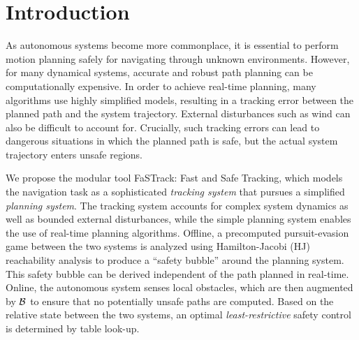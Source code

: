 \section{Introduction}
 As autonomous systems become more commonplace, it is essential to perform motion planning safely for navigating through unknown environments. However, for many dynamical systems, accurate and robust path planning can be computationally expensive. In order to achieve real-time planning, many algorithms use highly simplified models, resulting in a tracking error between the planned path and the system trajectory. External disturbances such as wind can also be difficult to account for. Crucially, such tracking errors can lead to dangerous situations in which the planned path is safe, but the actual system trajectory enters unsafe regions.
 


We propose the modular tool FaSTrack: Fast and Safe Tracking, which models the navigation task as a sophisticated \textit{tracking system} that pursues a simplified \textit{planning system}. The tracking system accounts for complex system dynamics as well as bounded external disturbances, while the simple planning system enables the use of real-time planning algorithms. Offline, a precomputed pursuit-evasion game between the two systems is analyzed using Hamilton-Jacobi (HJ) reachability analysis to produce a ``safety bubble'' around the planning system. This safety bubble can be derived independent of the path planned in real-time. Online, the autonomous system senses local obstacles, which are then augmented by $\mathcal B$ to ensure that no potentially unsafe paths are computed. Based on the relative state between the two systems, an optimal \textit{least-restrictive} safety control is determined by table look-up. %

